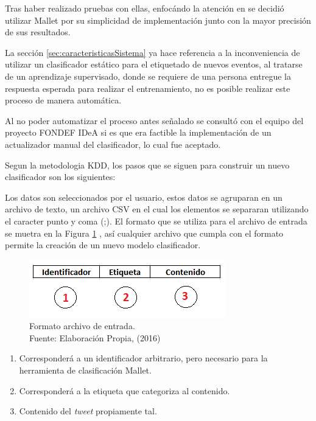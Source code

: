 Tras haber realizado pruebas con ellas, enfocándo la atención en  se decidió utilizar Mallet por su simplicidad de implementación junto con la mayor precisión de sus resultados.

La sección \ref{sec:caracteristicasSistema} ya hace referencia a la inconveniencia de utilizar un clasificador estático para el etiquetado de nuevos eventos, al tratarse de un aprendizaje supervisado, donde se requiere de una persona entregue la respuesta esperada para realizar el entrenamiento, no es posible realizar este proceso de manera automática.

Al no poder automatizar el proceso antes señalado se consultó con el equipo del proyecto FONDEF IDeA si es que era factible la implementación de un actualizador manual del clasificador, lo cual fue aceptado.

Segun la metodologia KDD, los pasos que se siguen para construir un nuevo clasificador son los siguientes:

Los datos son seleccionados por el usuario, estos datos se agruparan en un archivo de texto, un archivo CSV en el cual los elementos se separaran utilizando el caracter punto y coma (;). El formato que se utiliza para el archivo de entrada se muetra en la Figura \ref{fig:formatoFig} , así cualquier archivo que cumpla con el formato permite la creación de un nuevo modelo clasificador.

\begin{figure}[H]
	\centering
	\captionsetup{justification=centering}
	\includegraphics[scale=0.8]{images/FormatoArchivoEntrada.png}
	\caption[Formato archivo de entrada.]{Formato archivo de entrada.\\Fuente: Elaboración Propia, (2016)}
	\label{fig:formatoFig}
\end{figure}

\begin{enumerate}
\item Corresponderá a un identificador arbitrario, pero necesario para la herramienta de clasificación Mallet.
\item Corresponderá a la etiqueta que categoriza al contenido.
\item Contenido del \textit{tweet} propiamente tal.
\end{enumerate}

